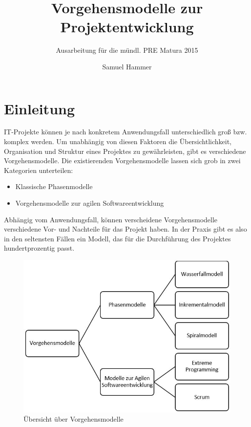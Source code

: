 \documentclass[a4paper, twopage]{scrreprt}
\author{Samuel Hammer}
\title{Vorgehensmodelle zur Projektentwicklung}
\subtitle{Ausarbeitung für die mündl. PRE Matura 2015}
\begin{document}
\maketitle
\tableofcontents

\chapter{Einleitung}
\label{ch:einleitung}
IT-Projekte können je nach konkretem Anwendungsfall unterschiedlich groß bzw. komplex werden. Um unabhängig von diesen Faktoren die Übersichtlichkeit, Organisation und Struktur eines Projektes zu gewährleisten, gibt es verschiedene Vorgehensmodelle. \newline
Die existierenden Vorgehensmodelle lassen sich grob in zwei Kategorien unterteilen: 
\begin{itemize}
	\item Klassische Phasenmodelle
	\item Vorgehensmodelle zur agilen Softwareentwicklung
\end{itemize}
Abhängig vom Anwendungsfall, können verscheidene Vorgehensmodelle verschiedene Vor- und Nachteile für das Projekt haben. In der Praxis gibt es also in den seltensten Fällen ein Modell, das für die Durchführung des Projektes hundertprozentig passt.
\begin{figure}[h]
\centering
	\includegraphics[scale=0.6]{Images/vorgehensmodelle_diagramm}
	\caption{Übersicht über Vorgehensmodelle\label{fig:vorgehensmodelle_diagramm}}
\end{figure}

\newpage
\end{document}
